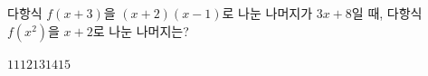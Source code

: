 다항식 $f(x+3)$을 $(x+2)(x-1)$로 나눈 나머지가 $3x+8$일 때, 다항식 $f(x^2)$을 $x+2$로 나눈 나머지는?
\begin{choices32}{$11$}{$12$}{$13$}{$14$}{$15$}\end{choices32}
